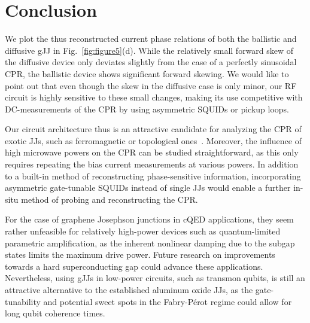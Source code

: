 \section{Conclusion}

We plot the thus reconstructed current phase relations of both the ballistic and diffusive gJJ in Fig.~\ref{fig:figure5}(d).
%
While the relatively small forward skew of the diffusive device only deviates slightly from the case of a perfectly sinusoidal CPR, the ballistic device shows significant forward skewing.
%
We would like to point out that even though the skew in the diffusive case is only minor, our RF circuit is highly sensitive to these small changes, making its use competitive with DC-measurements of the CPR by using asymmetric SQUIDs or pickup loops.

Our circuit architecture thus is an attractive candidate for analyzing the CPR of exotic JJs, such as ferromagnetic or topological ones~\cite{??}.
%
Moreover, the influence of high microwave powers on the CPR can be studied straightforward, as this only requires repeating the bias current measurements at various powers.
%
In addition to a built-in method of reconstructing phase-sensitive information, incorporating asymmetric gate-tunable SQUIDs instead of single JJs would enable a further in-situ method of probing and reconstructing the CPR.

For the case of graphene Josephson junctions in cQED applications, they seem rather unfeasible for relatively high-power devices such as quantum-limited parametric amplification, as the inherent nonlinear damping due to the subgap states limits the maximum drive power.
%
Future research on improvements towards a hard superconducting gap could advance these applications.
%
Nevertheless, using gJJs in low-power circuits, such as transmon qubits, is still an attractive alternative to the established aluminum oxide JJs, as the gate-tunability and potential sweet spots in the Fabry-Pérot regime could allow for long qubit coherence times.


\pagebreak
\clearpage



